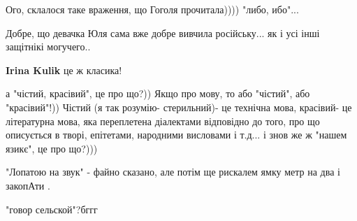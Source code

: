 \begin{itemize}
{Ого, склалося таке враження, що Гоголя прочитала)))) "либо, ибо"...

 
Добре, що девачка Юля сама вже добре вивчила російську... як і усі інші защітнікі могучего..

\begin{itemize}{
 
\textbf{Irina Kulik} це ж класика!
}\end{itemize}

 

а "чістий, красівий", це про що?)) Якщо про мову, то або "чістий", або
"красівий"!)) Чістий (я так розумію- стерильний)- це технічна мова, красівий-
це літературна мова, яка переплетена діалектами відповідно до того, про що
описується в творі, епітетами, народними висловами і т.д... і знов же ж "нашем
язикє", це про що?)))

 
"Лопатою на звук" - файно сказано, але потім ще рискалем ямку метр на два і закопАти .

 
"говор сельской"?бггг

}\end{itemize}


